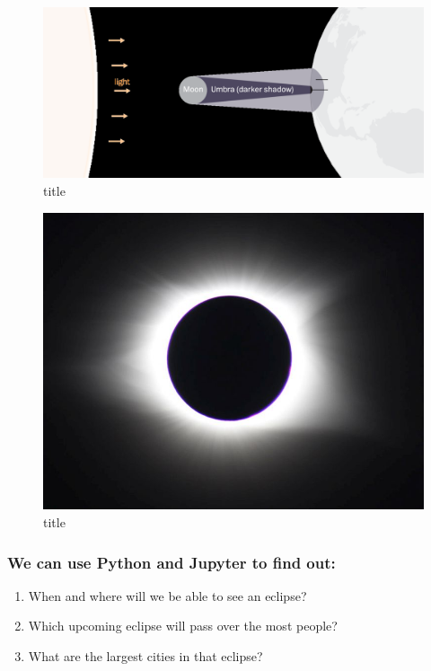 \documentclass[11pt]{article}
\makeatletter
\def\maxwidth{\ifdim\Gin@nat@width>\linewidth\linewidth
    \else\Gin@nat@width\fi}
\let\Oldincludegraphics\includegraphics
\renewcommand{\includegraphics}[1]{\Oldincludegraphics[width=.8\maxwidth]{#1}}
\makeatother
\begin{document}
    \begin{figure}
\centering
\includegraphics{img/_alignment-lines-720.png}
\caption{title}
\end{figure}

    \begin{figure}
\centering
\includegraphics{img/Corona-2017-Aug-21-m.jpg}
\caption{title}
\end{figure}

    \hypertarget{we-can-use-python-and-jupyter-to-find-out}{%
\subsubsection{We can use Python and Jupyter to find
out:}\label{we-can-use-python-and-jupyter-to-find-out}}

\begin{enumerate}
\def\labelenumi{\arabic{enumi}.}
\item
  When and where will we be able to see an eclipse?
\item
  Which upcoming eclipse will pass over the most people?
\item
  What are the largest cities in that eclipse?
\end{enumerate}
\end{document}
